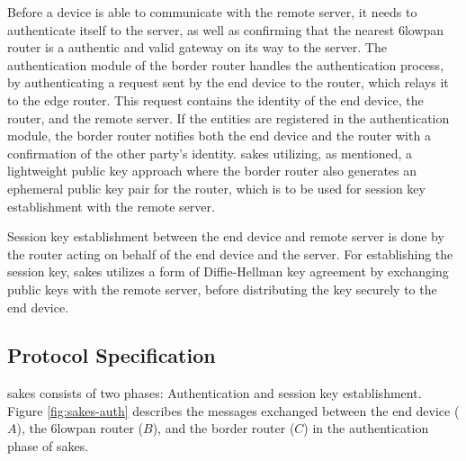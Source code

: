 Before a device is able to communicate with the remote server, it needs to authenticate itself to the server, as well as confirming that the nearest \gls{6lowpan} router is a authentic and valid gateway on its way to the server. The authentication module of the border router handles the authentication process, by authenticating a request sent by the end device to the router, which relays it to the edge router. This request contains the identity of the end device, the router, and the remote server. If the entities are registered in the authentication module, the border router notifies both the end device and the router with a confirmation of the other party's identity. \gls{sakes} utilizing, as mentioned, a lightweight public key approach where the border router also generates an ephemeral public key pair for the router, which is to be used for session key establishment with the remote server.

Session key establishment between the end device and remote server is done by the router acting on behalf of the end device and the server. For establishing the session key, \gls{sakes} utilizes a form of Diffie-Hellman key agreement by exchanging public keys with the remote server, before distributing the key securely to the end device.




\subsection{Protocol Specification}
\label{subsec:sakes-spec}

\gls{sakes} consists of two phases: Authentication and session key establishment. Figure \ref{fig:sakes-auth} describes the messages exchanged between the end device ($A$), the \gls{6lowpan} router ($B$), and the border router ($C$) in the authentication phase of \gls{sakes}.

